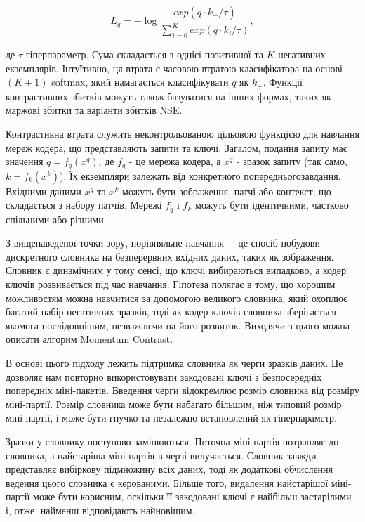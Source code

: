 \begin{equation}\label{eq:infonce_simple}
L_{q} = -\log{\frac{exp(q \cdot k_{+}/\tau)}{\sum_{i=0}^{K}{exp(q \cdot k_{i}/\tau)}}},
\end{equation}

\vspace{1.5em}

\noindent де $\tau$ гіперпараметр. Сума складається з однієї позитивної та $K$ негативних екземплярів. Інтуїтивно, ця втрата є часовою втратою класифікатора на основі $(K + 1)$ softmax, який намагається класифікувати $q$ як $k_{+}$. Функції контрастивних збитків можуть також базуватися на інших формах, таких як маржові збитки та варіанти збитків NSE.

Контрастивна втрата служить неконтрольованою цільовою функцією для навчання мереж кодера, що представляють запити та ключі. Загалом, подання запиту має значення $q = f_{q} (x^{q})$, де $f_{q}$ - це мережа кодера, а $x^{q}$ - зразок запиту (так само, $k = f_{k} (x^{k})$). Їх екземпляри залежать від конкретного попередньогозавдання. Вхідними даними $x^{q}$ та $x^{k}$ можуть бути зображення, патчі або контекст, що складається з набору патчів. Мережі $f_{q}$ і $f_{k}$ можуть бути ідентичними, частково спільними або різними.

З вищенаведеної точки зору, порівняльне навчання $-$ це спосіб побудови дискретного словника на безперервних вхідних даних, таких як зображення. Словник є динамічним у тому сенсі, що ключі вибираються випадково, а кодер ключів розвивається під час навчання. Гіпотеза полягає в тому, що хорошим можливостям можна навчитися за допомогою великого словника, який охоплює багатий набір негативних зразків, тоді як кодер ключів словника зберігається якомога послідовнішим, незважаючи на його розвиток. Виходячи з цього можна описати алгорим Momentum Contrast.

В основі цього підходу лежить підтримка словника як черги зразків даних. Це дозволяє нам повторно використовувати закодовані ключі з безпосередніх попередніх міні-пакетів. Введення черги відокремлює розмір словника від розміру міні-партії. Розмір словника може бути набагато більшим, ніж типовий розмір міні-партії, і може бути гнучко та незалежно встановлений як гіперпараметр.

Зразки у словнику поступово замінюються. Поточна міні-партія потрапляє до словника, а найстаріша міні-партія в черзі вилучається. Словник завжди представляє вибіркову підмножину всіх даних, тоді як додаткові обчислення ведення цього словника є керованими. Більше того, видалення найстарішої міні-партії може бути корисним, оскільки її закодовані ключі є найбільш застарілими і, отже, найменш відповідають найновішим.


